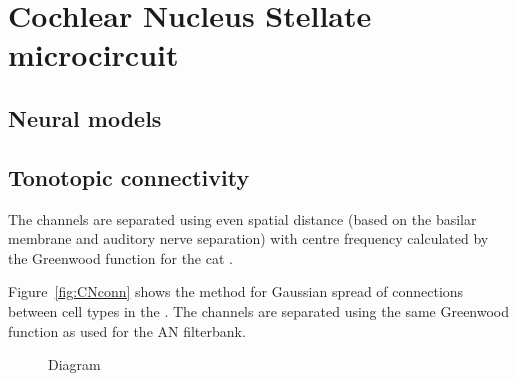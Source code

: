 




\section{Cochlear Nucleus Stellate microcircuit    \label{sec:CN:cochl-nucl-stell}}

\subsection{Neural models}




\subsection{Tonotopic connectivity    \label{sec:CN:tonot-conn}}

The channels are separated using even spatial distance (based on the
basilar membrane and auditory nerve separation) with centre frequency
calculated by the Greenwood function for the cat
\citep{Greenwood:1990}. 


Figure~\ref{fig:CNconn} shows the method for Gaussian spread of
connections between cell types in the \CN\@.  The channels are separated
using the same Greenwood function as used for the AN filterbank.

\begin{figure}[htb]
  \begin{center}
    \caption{Diagram    \label{fig:CNdiagram}}
  \end{center}
\end{figure}



